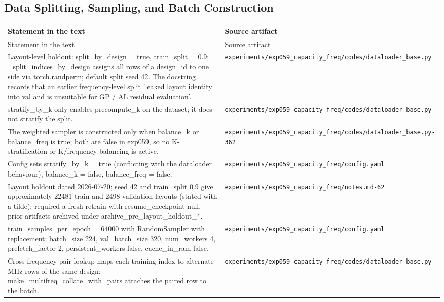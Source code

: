 \subsection*{Data Splitting, Sampling, and Batch Construction}
\begingroup\small
\begin{longtable}{p{} p{}}
\hline
Statement in the text & Source artifact \\
\hline
\endfirsthead
\hline
Statement in the text & Source artifact \\
\hline
\endhead
Layout-level holdout: split\_by\_design = true, train\_split = 0.9; \_split\_indices\_by\_design assigns all rows of a design\_id to one side via torch.randperm; default split seed 42. The docstring records that an earlier frequency-level split 'leaked layout identity into val and is unsuitable for GP / AL residual evaluation'. & \texttt{experiments/\allowbreak{}exp059\_\allowbreak{}capacity\_\allowbreak{}freq/\allowbreak{}codes/\allowbreak{}dataloader\_\allowbreak{}base.py} \\
stratify\_by\_k only enables precompute\_k on the dataset; it does not stratify the split. & \texttt{experiments/\allowbreak{}exp059\_\allowbreak{}capacity\_\allowbreak{}freq/\allowbreak{}codes/\allowbreak{}dataloader\_\allowbreak{}base.py} \\
The weighted sampler is constructed only when balance\_k or balance\_freq is true; both are false in exp059, so no K-stratification or K/frequency balancing is active. & \texttt{experiments/\allowbreak{}exp059\_\allowbreak{}capacity\_\allowbreak{}freq/\allowbreak{}codes/\allowbreak{}dataloader\_\allowbreak{}base.py-362} \\
Config sets stratify\_by\_k = true (conflicting with the dataloader behaviour), balance\_k = false, balance\_freq = false. & \texttt{experiments/\allowbreak{}exp059\_\allowbreak{}capacity\_\allowbreak{}freq/\allowbreak{}config.yaml} \\
Layout holdout dated 2026-07-20; seed 42 and train\_split 0.9 give approximately 22481 train and 2498 validation layouts (stated with a tilde); required a fresh retrain with resume\_checkpoint null, prior artifacts archived under archive\_pre\_layout\_holdout\_*. & \texttt{experiments/\allowbreak{}exp059\_\allowbreak{}capacity\_\allowbreak{}freq/\allowbreak{}notes.md-62} \\
train\_samples\_per\_epoch = 64000 with RandomSampler with replacement; batch\_size 224, val\_batch\_size 320, num\_workers 4, prefetch\_factor 2, persistent\_workers false, cache\_in\_ram false. & \texttt{experiments/\allowbreak{}exp059\_\allowbreak{}capacity\_\allowbreak{}freq/\allowbreak{}config.yaml} \\
Cross-frequency pair lookup maps each training index to alternate-MHz rows of the same design; make\_multifreq\_collate\_with\_pairs attaches the paired row to the batch. & \texttt{experiments/\allowbreak{}exp059\_\allowbreak{}capacity\_\allowbreak{}freq/\allowbreak{}codes/\allowbreak{}dataloader\_\allowbreak{}base.py} \\
\hline
\end{longtable}
\endgroup

